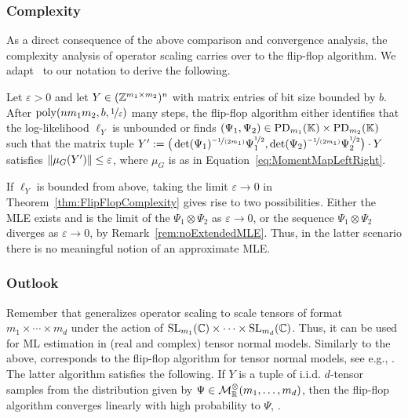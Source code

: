 \subsubsection*{Complexity}

As a direct consequence of the above comparison and convergence analysis, the complexity analysis of operator scaling carries over to the flip-flop algorithm.
We adapt~\cite[Theorem~1.1]{burgisser2017alternating} to our notation to derive the following.

\begin{theorem} \label{thm:FlipFlopComplexity}
	Let $\varepsilon > 0$ and let $Y \in (\mathbb Z^{m_1 \times m_2})^n$ with matrix entries of bit size bounded by $b$. After $\operatorname{poly}(nm_1m_2, b, \nicefrac{1}{\varepsilon})$ many steps, the flip-flop algorithm either identifies that the log-likelihood $\ell_Y$ is unbounded or finds $(\Psi_1, \Psi_2) \in \operatorname{PD}_{m_1}(\mathbb K) \times \operatorname{PD}_{m_2}(\mathbb K)$ such that the matrix tuple $Y' := \big( \det(\Psi_1)^{\nicefrac{-1}{(2m_1)}} \Psi_1^{\nicefrac{1}{2}}, \det(\Psi_2)^{\nicefrac{-1}{(2m_1)}} \Psi_2^{\nicefrac{1}{2}} \big) \cdot Y$ satisfies $\|\mu_{G}(Y')\| \leq \varepsilon$, where $\mu_G$ is as in Equation~\eqref{eq:MomentMapLeftRight}.
\end{theorem}

If $\ell_Y$ is bounded from above, taking the limit $\varepsilon \to 0$ in Theorem~\ref{thm:FlipFlopComplexity} gives rise to two possibilities. Either the MLE exists and is the limit of the $\Psi_1 \otimes \Psi_2$ as $\varepsilon \to 0$, or the sequence $\Psi_1 \otimes \Psi_2$ diverges as $\varepsilon \to 0$, by Remark~\ref{rem:noExtendedMLE}.
Thus, in the latter scenario there is no meaningful notion of an approximate MLE.

\subsubsection*{Outlook}
Remember that \cite[Algorithm~1]{burgisser2017alternating} generalizes operator scaling to scale tensors of format $m_1 \times \cdots \times m_d$ under the action of $\operatorname{SL}_{m_1}(\mathbb C) \times \cdots \times \operatorname{SL}_{m_d}(\mathbb C)$. Thus, it can be used for ML estimation in (real and complex) tensor normal models.
Similarly to the above, \cite[Algorithm~1]{burgisser2017alternating} corresponds to the flip-flop algorithm for tensor normal models, see e.g., \cite[Algorithm~2]{OptimalSampleComplexity}.
The latter algorithm satisfies the following. If $Y$ is a tuple of i.i.d. $d$-tensor samples from the distribution given by $\Psi \in \mathcal{M}^{\otimes}_{\mathbb R}(m_1,\ldots,m_d)$, then the flip-flop algorithm converges linearly with high probability to $\Psi$, \cite[Theorems~2.9 and~2.10]{OptimalSampleComplexity}.

